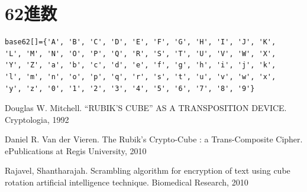 \documentclass[a4j,titlepage]{jsarticle}
\begin{document}
\section{62進数}
\begin{verbatim}
base62[]={'A', 'B', 'C', 'D', 'E', 'F', 'G', 'H', 'I', 'J', 'K', 
'L', 'M', 'N', 'O', 'P', 'Q', 'R', 'S', 'T', 'U', 'V', 'W', 'X', 
'Y', 'Z', 'a', 'b', 'c', 'd', 'e', 'f', 'g', 'h', 'i', 'j', 'k', 
'l', 'm', 'n', 'o', 'p', 'q', 'r', 's', 't', 'u', 'v', 'w', 'x', 
'y', 'z', '0', '1', '2', '3', '4', '5', '6', '7', '8', '9'}
\end{verbatim}

\begin{thebibliography}{9}

 Douglas W. Mitchell. ``RUBIK'S CUBE'' AS A TRANSPOSITION DEVICE. Cryptologia, 1992

 Daniel R. Van der Vieren. The Rubik's Crypto-Cube : a Trans-Composite Cipher. ePublications at Regis University, 2010

 Rajavel, Shantharajah. Scrambling algorithm for encryption of text using cube rotation artificial intelligence technique. Biomedical Research, 2010

\end{thebibliography}
\end{document}
